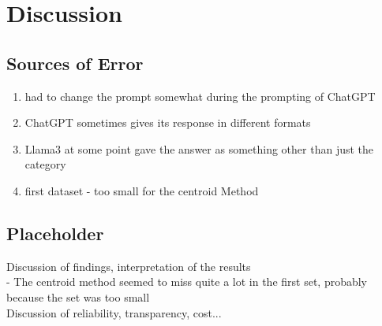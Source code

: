 \section*{Discussion}
\subsection*{Sources of Error}
\begin{enumerate}
    \item had to change the prompt somewhat during the prompting of ChatGPT
    \item ChatGPT sometimes gives its response in different formats
    \item Llama3 at some point gave the answer as something other than just the category
    \item first dataset - too small for the centroid Method
\end{enumerate}

\subsection*{Placeholder}
Discussion of findings, interpretation of the results\\
- The centroid method seemed to miss quite a lot in the first set, probably because the set was too small\\

Discussion of reliability, transparency, cost...